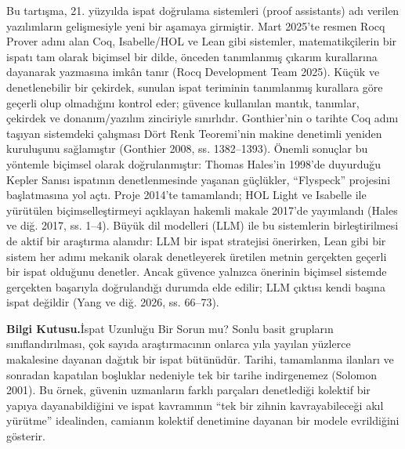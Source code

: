 Bu tartışma, 21. yüzyılda ispat doğrulama sistemleri (proof assistants) adı verilen yazılımların gelişmesiyle yeni bir aşamaya girmiştir. Mart 2025’te resmen Rocq Prover adını alan Coq, Isabelle/HOL ve Lean gibi sistemler, matematikçilerin bir ispatı tam olarak biçimsel bir dilde, önceden tanımlanmış çıkarım kurallarına dayanarak yazmasına imkân tanır (Rocq Development Team 2025). Küçük ve denetlenebilir bir çekirdek, sunulan ispat teriminin tanımlanmış kurallara göre geçerli olup olmadığını kontrol eder; güvence kullanılan mantık, tanımlar, çekirdek ve donanım/yazılım zinciriyle sınırlıdır. Gonthier’nin o tarihte Coq adını taşıyan sistemdeki çalışması Dört Renk Teoremi’nin makine denetimli yeniden kuruluşunu sağlamıştır (Gonthier 2008, ss. 1382–1393). Önemli sonuçlar bu yöntemle biçimsel olarak doğrulanmıştır: Thomas Hales’in 1998’de duyurduğu Kepler Sanısı ispatının denetlenmesinde yaşanan güçlükler, “Flyspeck” projesini başlatmasına yol açtı. Proje 2014’te tamamlandı; HOL Light ve Isabelle ile yürütülen biçimselleştirmeyi açıklayan hakemli makale 2017’de yayımlandı (Hales ve diğ. 2017, ss. 1–4). Büyük dil modelleri (LLM) ile bu sistemlerin birleştirilmesi de aktif bir araştırma alanıdır: LLM bir ispat stratejisi önerirken, Lean gibi bir sistem her adımı mekanik olarak denetleyerek üretilen metnin gerçekten geçerli bir ispat olduğunu denetler. Ancak güvence yalnızca önerinin biçimsel sistemde gerçekten başarıyla doğrulandığı durumda elde edilir; LLM çıktısı kendi başına ispat değildir (Yang ve diğ. 2026, ss. 66–73).

\begin{tcolorbox}[bookbox,colback=cEx]\textbf{\textsf{\textcolor{cAcc}{Bilgi Kutusu.}}}\quad İspat Uzunluğu Bir Sorun mu? Sonlu basit grupların sınıflandırılması, çok sayıda araştırmacının onlarca yıla yayılan yüzlerce makalesine dayanan dağıtık bir ispat bütünüdür. Tarihi, tamamlanma ilanları ve sonradan kapatılan boşluklar nedeniyle tek bir tarihe indirgenemez (Solomon 2001). Bu örnek, güvenin uzmanların farklı parçaları denetlediği kolektif bir yapıya dayanabildiğini ve ispat kavramının “tek bir zihnin kavrayabileceği akıl yürütme” idealinden, camianın kolektif denetimine dayanan bir modele evrildiğini gösterir.\end{tcolorbox}


